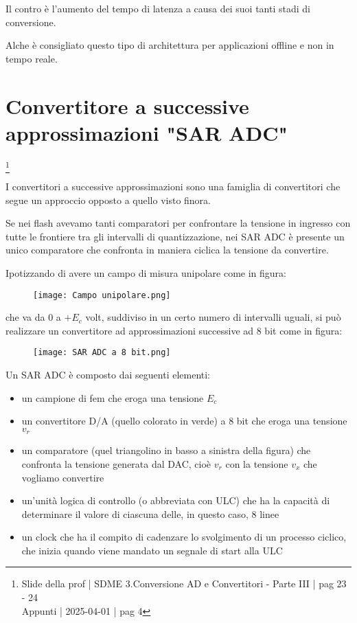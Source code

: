 Il contro è l'aumento del tempo di latenza a causa dei suoi tanti stadi di conversione. \newline 

Alche è consigliato questo tipo di architettura per applicazioni offline e non in tempo reale. \newline 

\newpage

\section{Convertitore a successive approssimazioni "SAR ADC"}
\footnote{Slide della prof | SDME 3.Conversione AD e Convertitori - Parte III | pag 23 - 24 \\  
Appunti | 2025-04-01 | pag 4 }

I convertitori a successive approssimazioni sono una famiglia di convertitori che segue un approccio opposto a quello visto finora. \newline

Se nei flash avevamo tanti comparatori per confrontare la tensione in ingresso con tutte le frontiere tra gli intervalli di quantizzazione, 
nei SAR ADC è presente un unico comparatore che confronta in maniera ciclica la tensione da convertire. \newline 

Ipotizzando di avere un campo di misura unipolare come in figura: 

\begin{figure}[h]
    \centering
    \texttt{[image: Campo unipolare.png]}
\end{figure}

che va da 0 a $+E_c$ volt, suddiviso in un certo numero di intervalli uguali, si può realizzare un convertitore ad approssimazioni successive ad 8 bit come in figura: 

\begin{figure}[h]
    \centering
    \texttt{[image: SAR ADC a 8 bit.png]}
\end{figure}

Un SAR ADC è composto dai seguenti elementi: 

\begin{itemize}
    \item un campione di fem che eroga una tensione $E_c$ 
    \item un convertitore D/A (quello colorato in verde) a 8 bit che eroga una tensione $v_r$ 
    \item un comparatore (quel triangolino in basso a sinistra della figura) che confronta la tensione generata dal DAC, cioè $v_r$ con la tensione $v_x$ che vogliamo convertire 
    \item un'unità logica di controllo (o abbreviata con ULC) che ha la capacità di determinare il valore di ciascuna delle, in questo caso, 8 linee 
    \item un clock che ha il compito di cadenzare lo svolgimento di un processo ciclico, che inizia quando viene mandato un segnale di start alla ULC 
\end{itemize}

